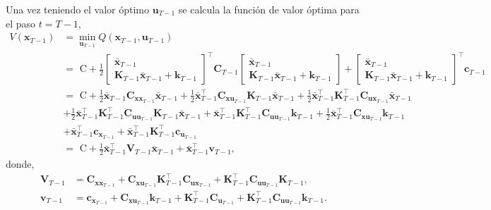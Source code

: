 Una vez teniendo el valor óptimo $\textbf{u}_{T-1}$
se calcula la función de valor óptima para el paso $t=T-1$,
\begin{equation}
    \begin{aligned}
    V(\mathbf{x}_{T-1}) &= \min_{\mathbf{u}_{T-1}}Q(\mathbf{x}_{T-1}, \mathbf{u}_{T-1}) \\
    &= \text{ C} + \frac{1}{2}
    \begin{bmatrix}
        \bar{\mathbf{x}}_{T-1} \\
        \mathbf{K}_{T-1}\bar{\mathbf{x}}_{T-1} + \mathbf{k}_{T-1}
    \end{bmatrix}^{\top}
    \mathbf{C}_{T-1} 
    \begin{bmatrix}
        \bar{\mathbf{x}}_{T-1} \\
        \mathbf{K}_{T-1}\bar{\mathbf{x}}_{T-1} + \mathbf{k}_{T-1}
    \end{bmatrix}
    + 
    \begin{bmatrix}
        \bar{\mathbf{x}}_{T-1} \\
        \mathbf{K}_{T-1}\bar{\mathbf{x}}_{T-1} + \mathbf{k}_{T-1}
    \end{bmatrix}^{\top}
    \mathbf{c}_{T-1} \\
    &= \text{ C} + 
    \frac{1}{2}\bar{\mathbf{x}}_{T-1} \mathbf{C}_{\mathbf{x}\mathbf{x}_{T-1}}
    \bar{\mathbf{x}}_{T-1}  
    + \frac{1}{2}\bar{\mathbf{x}}_{T-1}^{\top}
    \mathbf{C}_{\mathbf{x}\mathbf{u}_{T-1}}
    \mathbf{K}_{T-1}
    \bar{\mathbf{x}}_{T-1} 
     +
    \frac{1}{2}
    \bar{\mathbf{x}}_{T-1}^{\top}
    \mathbf{K}_{T-1}^{\top}
    \mathbf{C}_{\mathbf{u}\mathbf{x}_{T-1}} 
    \bar{\mathbf{x}}_{T-1} \\
    & + \frac{1}{2}
    \bar{\mathbf{x}}_{T-1}^{\top}
    \mathbf{K}_{T-1}^{\top}
    \mathbf{C}_{\mathbf{u}\mathbf{u}_{T-1}}\mathbf{K}_{T-1}
    \bar{\mathbf{x}}_{T-1} 
    + 
    \bar{\mathbf{x}}_{T-1}^{\top}
    \mathbf{K}_{T-1}^{\top} 
    \mathbf{C}_{\mathbf{u}\mathbf{u}_{T-1}}
    \mathbf{k}_{T-1} 
    + 
    \frac{1}{2} 
    \bar{\mathbf{x}}_{T-1}^{\top}
    \mathbf{C}_{\mathbf{x}\mathbf{u}_{T-1}}\mathbf{k}_{T-1} \\
    &+ \bar{\mathbf{x}}_{T-1}^{\top}
    \mathbf{c}_{\mathbf{x}_{T-1}} + 
    \bar{\mathbf{x}}^{\top}_{T-1}
    \mathbf{K}_{T-1}^{\top}
    \mathbf{c}_{\mathbf{u}_{T-1}} \\
    &= \text{ C} + \frac{1}{2}\bar{\mathbf{x}}_{T-1}^{\top} \mathbf{V}_{T-1}\bar{\mathbf{x}}_{T-1} + \bar{\mathbf{x}}_{T-1}^{\top} \mathbf{v}_{T-1},
    \end{aligned}
    \label{eq:ilqr_VT}
\end{equation}
donde,
\begin{align}
    \mathbf{V}_{T-1} &= \mathbf{C}_{\mathbf{x}\mathbf{x}_{T-1}} 
    + \mathbf{C}_{\mathbf{xu}_{T-1}} 
    \mathbf{K}_{T-1}^{\top} 
    \mathbf{C}_{\mathbf{ux}_{T-1}}
    + \mathbf{K}_{T-1}^{\top}\mathbf{C}_{\mathbf{uu}_{T-1}}
    \mathbf{K}_{T-1}, \\
    \mathbf{v}_{T-1} &= \mathbf{c}_{\mathbf{x}_{T-1}} 
    + \mathbf{C}_{\mathbf{xu}_{T-1}}\mathbf{k}_{T-1} 
    + \mathbf{K}_{T-1}^{\top} \mathbf{C}_{\mathbf{u}_{T-1}} 
    + \mathbf{K}_{T-1}^{\top} \mathbf{C}_{\mathbf{uu}_{T-1}}\mathbf{k}_{T-1}.
\end{align}

